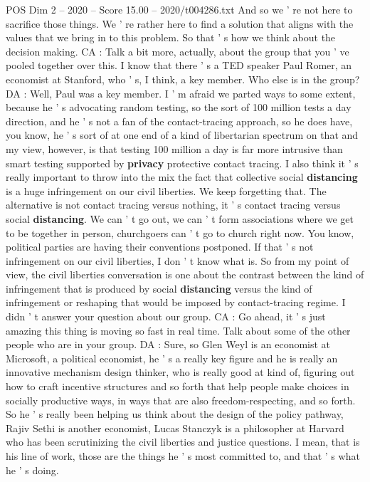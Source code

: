 \begin{textsample}{POS Dim 2 – 2020 – Score 15.00 – 2020/t004286.txt}
And so we ' re not here to sacrifice those things.
We ' re rather here to find a solution that aligns with the values that we bring in to this problem.
So that ' s how we think about the decision making.
CA : Talk a bit more, actually, about the group that you ' ve pooled together over this.
I know that there ' s a TED speaker Paul Romer, an economist at Stanford, who ' s, I think, a key member.
Who else is in the group?
DA : Well, Paul was a key member.
I ' m afraid we parted ways to some extent, because he ' s advocating random testing, so the sort of 100 million tests a day direction, and he ' s not a fan of the contact-tracing approach, so he does have, you know, he ' s sort of at one end of a kind of libertarian spectrum on that and my view, however, is that testing 100 million a day is far more intrusive than smart testing supported by \textbf{privacy} protective contact tracing.
I also think it ' s really important to throw into the mix the fact that collective social \textbf{distancing} is a huge infringement on our civil liberties.
We keep forgetting that.
The alternative is not contact tracing versus nothing, it ' s contact tracing versus social \textbf{distancing}.
We can ' t go out, we can ' t form associations where we get to be together in person, churchgoers can ' t go to church right now.
You know, political parties are having their conventions postponed.
If that ' s not infringement on our civil liberties, I don ' t know what is.
So from my point of view, the civil liberties conversation is one about the contrast between the kind of infringement that is produced by social \textbf{distancing} versus the kind of infringement or reshaping that would be imposed by contact-tracing regime.
I didn ' t answer your question about our group.
CA : Go ahead, it ' s just amazing this thing is moving so fast in real time.
Talk about some of the other people who are in your group.
DA : Sure, so Glen Weyl is an economist at Microsoft, a political economist, he ' s a really key figure and he is really an innovative mechanism design thinker, who is really good at kind of, figuring out how to craft incentive structures and so forth that help people make choices in socially productive ways, in ways that are also freedom-respecting, and so forth.
So he ' s really been helping us think about the design of the policy pathway, Rajiv Sethi is another economist, Lucas Stanczyk is a philosopher at Harvard who has been scrutinizing the civil liberties and justice questions.
I mean, that is his line of work, those are the things he ' s most committed to, and that ' s what he ' s doing.

\end{textsample}
